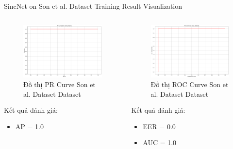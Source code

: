\documentclass[notheorems, aspectratio=54]{beamer}
\begin{document}
\begin{frame}{SincNet on Son et al. Dataset Training Result Visualization}
	\begin{columns}
		\begin{column}{0.47\textwidth}
			\begin{figure}[H]
				\includegraphics[width=0.9\linewidth]{result/pr_curve_vietnamese.png}
				\caption{Đồ thị PR Curve Son et al. Dataset Dataset}
			\end{figure}
		Kết quả đánh giá:
		\begin{itemize}
			\item AP = 1.0
		\end{itemize}
		\end{column}
		\begin{column}{0.5\textwidth}
			\begin{figure}[H]
				\includegraphics[width=0.9\linewidth]{result/roc_curve_vietnamese.png}
				\caption{Đồ thị ROC Curve Son et al. Dataset Dataset}
			\end{figure}
		Kết quả đánh giá:
		\begin{itemize}
			\item EER = 0.0
			\item AUC = 1.0
		\end{itemize}
		\end{column}
	\end{columns}
\end{frame}
\end{document}
